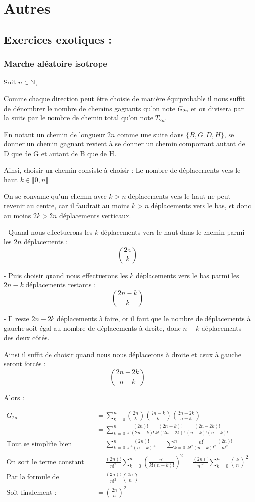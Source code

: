 \section{Autres}
\subsection{Exercices exotiques : }
\newpage
\subsubsection{Marche aléatoire isotrope}
Soit $n \in \mathbb{N}$, 

Comme chaque direction peut être choisie de manière équiprobable
il nous suffit de dénombrer le nombre de chemins gagnants qu'on note $G_{2n}$ et on divisera par 
la suite par le nombre de chemin total qu'on note $T_{2n}$. 


En notant un chemin de longueur $2n$ comme une suite dans
$\{B,G,D,H\}$, se donner un chemin gagnant revient à se donner un chemin 
comportant autant de D que de G et autant de B que de H.


Ainsi, choisir un chemin consiste à choisir :
Le nombre de déplacements vers le haut $k \in \llbracket 0,n\rrbracket$

On se convainc qu'un chemin avec $k> n$ déplacements vers le haut
ne peut revenir au centre, car il faudrait au moins $k>n$ déplacements vers le bas, et donc au moins $2k>2n$ déplacements verticaux.

- Quand nous effectuerons les $k$ déplacements vers le haut dans le chemin 
parmi les $2n$ déplacements : $$\binom{2n}{k}$$


- Puis choisir quand nous effectuerons les $k$ déplacements vers le bas parmi les $2n-k$ déplacements restants : 
$$ \binom{2n-k}{k}$$ 

- Il reste $2n-2k$ déplacements à faire, or il faut que le nombre de déplacements à gauche 
soit égal au nombre de déplacements à droite, donc $n-k$ déplacements des deux côtés.

Ainsi il suffit de choisir quand nous nous déplacerons 
à droite et ceux à gauche seront forcés : $$\binom{2n-2k}{n-k}$$

Alors : 

$$ 
\begin{aligned} 
G_{2n} &= \sum_{k=0}^{n}   \binom{2n}{k}\binom{2n-k}{k}\binom{2n-2k}{n-k}
    \\ &= \sum_{k=0}^{n} \frac{(2n)!}{k!(2n-k)!} \frac{(2n-k)!}{k!(2n-2k)!} \frac{(2n-2k)!}{(n-k)!(n-k)!}
    \\ \text{Tout se simplifie bien } &= \sum_{k=0}^{n} \frac{(2n)!}{k!^2(n-k)!^2} = \sum_{k=0}^{n} \frac{n!^2}{k!^2(n-k)!^2} \frac{(2n)!}{n!^2}
    \\ \text{On sort le terme constant qui dérange }&= \frac{(2n)!}{n!^2} \sum_{k=0}^{n} (\frac{n!}{k!(n-k)!})^2 = \frac{(2n)!}{n!^2} \sum_{k=0}^{n} \binom{k}{n}^2
    \\ \text{Par la formule de Vandermonde }&= \frac{(2n)!}{n!^2} \binom{2n}{n}
    \\ \text{Soit finalement : } &= \binom{2n}{n}^2 
\end{aligned}
$$

